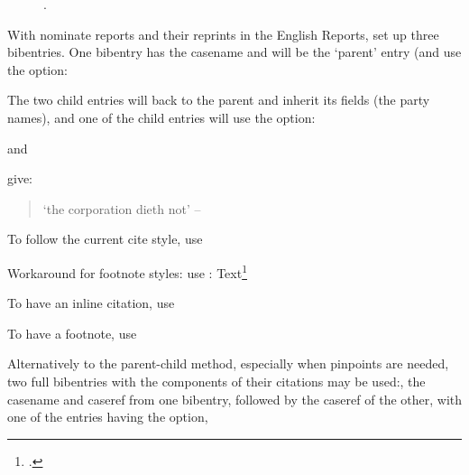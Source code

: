 \begin{figure}
\begin{center}
\toggletrue{lcimageshow}
\caption[Equity follows Law]{.}
\end{center}
\end{figure}

\p With nominate reports and their reprints in the English Reports, set up three bibentries.  One bibentry has the casename and will be the `parent' entry (and use the  option:


\begin{quotation}\noindent
{}
\end{quotation}

The two child entries will  back to the parent and inherit its fields (the party names), and one of the child entries will use the  option:

\begin{quotation}\noindent
{}
\end{quotation}

and

\begin{quotation}\noindent
{}
\end{quotation}
give:
\begin{quotation}\noindent
`the corporation dieth not' -- 
\end{quotation}

\p To  follow the current cite style, use

Workaround for footnote styles: use : Text\footnote{.}

\p To have an inline citation, use


\p To have a footnote, use



\p Alternatively to the parent-child method, especially when pinpoints are needed, two full bibentries with the components of their citations may be used:, the casename and caseref from one bibentry, followed by the caseref of the other, with one of the entries having the  option,

